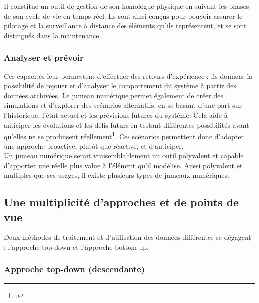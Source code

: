 Il constitue un outil de gestion de son homologue physique en suivant les phases de son cycle de vie en temps réel. Ils sont ainsi conçus pour pouvoir assurer le pilotage et la surveillance à distance des éléments qu'ils représentent, et se sont distingués dans la maintenance.

            \subsubsection{Analyser et prévoir}

Ces capacités leur permettent d'effectuer des retours d'expérience : ils donnent la possibilité de rejouer et d'analyser le comportement du système à partir des données archivées. Le jumeau numérique permet également de créer des simulations et d’explorer des scénarios alternatifs, en se basant d’une part sur l'historique, l'état actuel et les prévisions futures du système. Cela aide à anticiper les évolutions et les défis futurs en testant différentes possibilités avant qu'elles ne se produisent réellement\footcite{donniniToutComprendreJumeau2023}. Ces scénarios permettent donc d’adopter une approche proactive, plutôt que réactive, et d'anticiper.\\

Un jumeau numérique serait vraisemblablement un outil polyvalent et capable d'apporter une réelle plus value à l'élément qu'il modélise. Aussi polyvalent et multiples que ses usages, il existe plusieurs types de jumeaux numériques.

        \subsection{Une multiplicité d'approches et de points de vue}

Deux méthodes de traitement et d'utilisation des données différentes se dégagent : l'approche top-down et l'approche bottom-up.

            \subsubsection{Approche top-down (descendante) }

